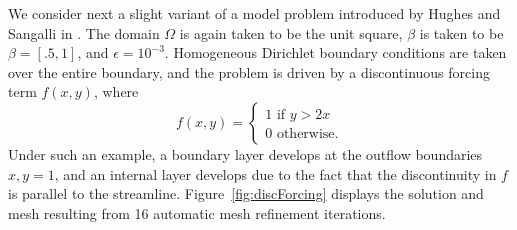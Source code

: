 \documentclass[final,leqno]{siamltex}
\begin{document}
We consider next a slight variant of a model problem introduced by Hughes and Sangalli in \cite{HughesVMS}.  The domain $\Omega$ is again taken to be the unit square, $\beta$ is taken to be $\beta = [.5,1]$, and $\epsilon = 10^{-3}$.  Homogeneous Dirichlet boundary conditions are taken over the entire boundary, and the problem is driven by a discontinuous forcing term $f(x,y)$, where
\[
f(x,y) = \begin{cases}
1 \text{ if } y > 2x \\
0 \text{ otherwise}.
\end{cases}
\]
Under such an example, a boundary layer develops at the outflow boundaries $x,y = 1$, and an internal layer develops due to the fact that the discontinuity in $f$ is parallel to the streamline.  Figure~\ref{fig:discForcing} displays the solution and mesh resulting from 16 automatic mesh refinement iterations.  
\end{document}
